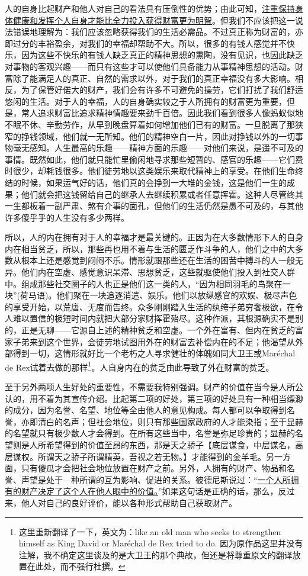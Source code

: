 \documentclass[12pt,oneside]{book}
\begin{document}
人的自身比起财产和他人对自己的看法具有压倒性的优势；由此可知，\uline{注重保持身体健康和发挥个人自身才能比全力投入获得财富更为明智}。但我们不应该把这一说法错误地理解为：我们应该忽略获得我们的生活必需品。不过真正称为财富的，亦即过分的丰裕盈余，对我们的幸福却帮助不大。所以，很多的有钱人感觉并不快乐，因为这些不快乐的有钱人缺乏真正的精神思想的熏陶，没有见识，也因此缺乏对事物的客观兴趣——而只有这些才可以使他们具备能力从事精神思想的活动。财富除了能满足人的真正、自然的需求以外，对于我们的真正幸福没有多大影响。相反，为了保管好偌大的财产，我们会有许多不可避免的操劳，它们打扰了我们舒适悠闲的生活。对于人的幸福，人的自身确实较之于人所拥有的财富更为重要，但是，常人追求财富比追求精神情趣要来劲千百倍。因此我们看到很多人像蚂蚁似地不眠不休、辛勤劳作，从早到晚盘算着如何增加他们已有的财富。一旦脱离了那狭窄的挣钱领域，他们就一无所知。他们的精神空白一片，因此对挣钱以外的一切事物毫无感知。人生最高的乐趣——精神方面的乐趣——对他们来说，是遥不可及的事情。既然如此，他们就只能忙里偷闲地寻求那些短暂的、感官的乐趣——它们费时很少，却耗钱很多。他们徒劳地以这类娱乐来取代精神上的享受。在他们生命终结的时候，如果运气好的话，他们真的会挣到一大堆的金钱，这是他们一生的成果；他们就会把这钱留给自己的继承人去继续积累或者任意挥霍。这种人尽管终其一生都板着一副严肃、煞有介事的面孔，但他们的生活仍然是愚不可及的，与其他许多傻乎乎的人生没有多少两样。 

所以，人的内在拥有对于人的幸福才是最关键的。正因为在大多数情形下人的自身内在相当贫乏，所以，那些再也用不着与生活的匮乏作斗争的人，他们之中的大多数从根本上还是感觉到闷闷不乐。情形就跟那些还在生活的困苦中搏斗的人一般无异。他们内在空虚、感觉意识呆滞、思想贫乏，这些就驱使他们投入到社交人群中。组成那些社交圈子的人也正是他们这一类的人，“因为相同羽毛的鸟聚在一块”(荷马语)。他们聚在一块追逐消遣、娱乐。他们以放纵感官的欢娱、极尽声色的享受开始，以荒唐、无度而告终。众多刚刚踏入生活的纨绔子弟穷奢极欲，在令人难以置信的极短时间内就把大部分家财挥霍殆尽。这种作派，其根源确实不是别的，正是无聊——它源自上述的精神贫乏和空虚。一个外在富有、但内在贫乏的富家子弟来到这个世界，会徒劳地试图用外在的财富去补偿内在的不足；他渴望从外部得到一切，这情形就好比一个老朽之人寻求健壮的体魄如同大卫王或Maréchal de Rex试着去做的那样\footnote{这里重新翻译了一下，英文为：like an old man who seeks to strengthen himself as King David or Maréchal de Rex tried to do. 因为原作品这里并没有注解，我不确定这里谈及的是大卫王的那个典故，但还是将尊重原文的翻译放置在此处，而不强行杜撰。}。人自身内在的贫乏由此导致了外在财富的贫乏。 

至于另外两项人生好处的重要性，不需要我特别强调。财产的价值在当今是人所公认的，用不着为其宣传介绍。比起第二项的好处，第三项的好处具有一种相当缥渺的成分，因为名誉、名望、地位等全由他人的意见构成。每人都可以争取得到名誉，亦即清白的名声；但社会地位，则只有那些国家政府的人才能染指；至于显赫的名望就只有极少数人才会得到。在所有这些当中，名誉是弥足珍贵的；显赫的名望则是人所希望得到的价值至昂的东西，那是天之骄子【底层谋食，中层谋名，高层谋权。所谓天之骄子所谓精英，吾视之若无物。】才能得到的金羊毛。另一方面，只有傻瓜才会把社会地位放置在财产之前。另外，人拥有的财产、物品和名誉、声望是处于—种所谓的互为影响、促进的关系。彼德尼斯说过：“\uline{一个人所拥有的财产决定了这个人在他人眼中的价值。}”如果这句话是正确的话，那么，反过来，他人对自己的良好评价，能以各种形式帮助自己获取财产。 
\end{document}
